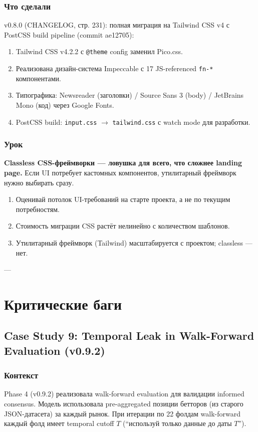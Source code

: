 \subsubsection*{Что сделали}
v0.8.0 (CHANGELOG, стр. 231): полная миграция на Tailwind CSS v4 с PostCSS build pipeline (commit ae12705):

\begin{enumerate}
\item Tailwind CSS v4.2.2 с \texttt{@theme} config заменил Pico.css.
\item Реализована дизайн-система Impeccable с 17 JS-referenced \texttt{fn-*} компонентами.
\item Типографика: Newsreader (заголовки) / Source Sans 3 (body) / JetBrains Mono (код) через Google Fonts.
\item PostCSS build: \texttt{input.css} $\to$ \texttt{tailwind.css} с watch mode для разработки.
\end{enumerate}

\subsubsection*{Урок}
\textbf{Classless CSS-фреймворки --- ловушка для всего, что сложнее landing page.} Если UI потребует кастомных компонентов, утилитарный фреймворк нужно выбирать сразу.

\begin{enumerate}
\item Оценивай потолок UI-требований на старте проекта, а не по текущим потребностям.
\item Стоимость миграции CSS растёт нелинейно с количеством шаблонов.
\item Утилитарный фреймворк (Tailwind) масштабируется с проектом; classless --- нет.
\end{enumerate}

---

\section{Критические баги}

\subsection{Case Study 9: Temporal Leak in Walk-Forward Evaluation (v0.9.2)}

\subsubsection*{Контекст}
Phase 4 (v0.9.2) реализовала walk-forward evaluation для валидации informed consensus. Модель использовала pre-aggregated позиции бетторов (из старого JSON-датасета) за каждый рынок. При итерации по 22 фолдам walk-forward каждый фолд имеет temporal cutoff $T$ (``используй только данные до даты $T$'').

